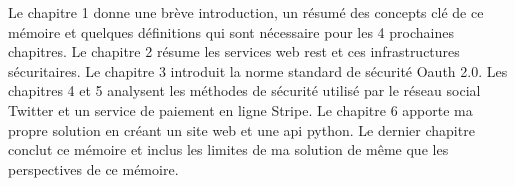 Le chapitre 1 donne une brève introduction, un résumé des concepts clé de ce mémoire et quelques définitions qui sont nécessaire pour les 4 prochaines chapitres. Le chapitre 2 résume les services web rest et ces infrastructures sécuritaires. Le chapitre 3 introduit la norme standard de sécurité Oauth 2.0. Les chapitres 4 et 5 analysent les méthodes de sécurité utilisé par le réseau social Twitter et un service de paiement en ligne Stripe. Le chapitre 6 apporte ma propre solution en créant un site web et une api python. Le dernier chapitre conclut ce mémoire et inclus les limites de ma solution de même que les perspectives de ce mémoire. 














